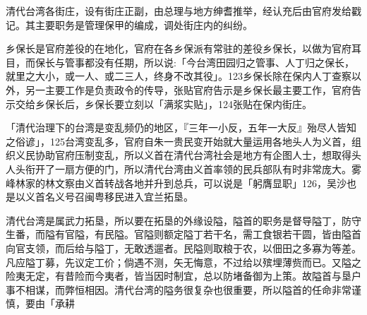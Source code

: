 
\noindent 清代台湾各街庄，设有街庄正副，由总理与地方绅耆推举，经认充后由官府发给戳记。其主要职务是管理保甲的编成，调处街庄内的纠纷。

\vfill
\begin{BookNotes}
\end{BookNotes}


\noindent 乡保长是官府差役的在地化，官府在各乡保派有常驻的差役乡保长，以做为官府耳目，而保长与管事都没有任期，所以说:「今台湾田园归之管事、人丁归之保长，就里之大小，或一人、或二三人，终身不改其役」。123乡保长除在保内人丁查察以外，另一主要工作是负责政令的传导，张贴官府告示是乡保长最主要工作，官府告示交给乡保长后，乡保长要立刻以「满浆实贴」，124张贴在保内街庄。


\noindent 「清代治理下的台湾是变乱频仍的地区，『三年一小反，五年一大反』殆尽人皆知之俗谚」，125台湾变乱多，官府自朱一贵民变开始就大量运用各地头人为义首，组织义民协助官府压制变乱，所以义首在清代台湾社会是地方有企图人士，想取得头人头衔开了一扇方便的门，所以清代台湾由义首率领的民兵部队有时非常庞大。雾峰林家的林文察由义首转战各地并升到总兵，可以说是「躬膺显职」126，吴沙也是以义首名义号召闽粤移民进入宜兰拓垦。


\noindent 清代台湾是属武力拓垦，所以要在拓垦的外缘设隘，隘首的职务是督导隘丁，防守生番，而隘有官隘，有民隘。官隘则额定隘丁若干名，需工食银若干圆，皆由隘首向官支领，而后给与隘丁，无敢透遛者。民隘则取粮于农，以佃田之多寡为等差。凡应隘丁募，先议定工价；倘遇不测，矢无悔意，不过给以殡埋薄赀而已。又隘之险夷无定，有昔险而今夷者，皆当因时制宜，总以防堵备御为上策。故隘首与垦户事不相谋，而弊恒相因。清代台湾的隘务很复杂也很重要，所以隘首的任命非常谨慎，要由「承耕

\vfill
\begin{BookNotes}
\end{BookNotes}

